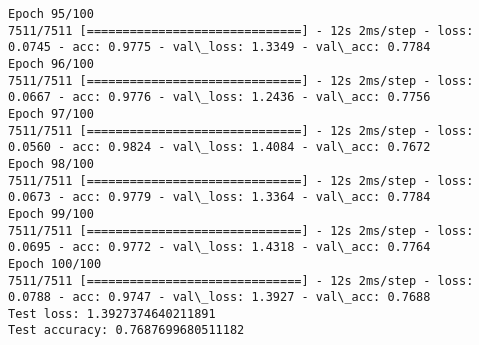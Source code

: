 \documentclass[11pt]{article}
\begin{document}
\begin{Verbatim}[commandchars=\\\{\}]
Epoch 95/100
7511/7511 [==============================] - 12s 2ms/step - loss: 0.0745 - acc: 0.9775 - val\_loss: 1.3349 - val\_acc: 0.7784
Epoch 96/100
7511/7511 [==============================] - 12s 2ms/step - loss: 0.0667 - acc: 0.9776 - val\_loss: 1.2436 - val\_acc: 0.7756
Epoch 97/100
7511/7511 [==============================] - 12s 2ms/step - loss: 0.0560 - acc: 0.9824 - val\_loss: 1.4084 - val\_acc: 0.7672
Epoch 98/100
7511/7511 [==============================] - 12s 2ms/step - loss: 0.0673 - acc: 0.9779 - val\_loss: 1.3364 - val\_acc: 0.7784
Epoch 99/100
7511/7511 [==============================] - 12s 2ms/step - loss: 0.0695 - acc: 0.9772 - val\_loss: 1.4318 - val\_acc: 0.7764
Epoch 100/100
7511/7511 [==============================] - 12s 2ms/step - loss: 0.0788 - acc: 0.9747 - val\_loss: 1.3927 - val\_acc: 0.7688
Test loss: 1.3927374640211891
Test accuracy: 0.7687699680511182

    \end{Verbatim}
\end{document}
